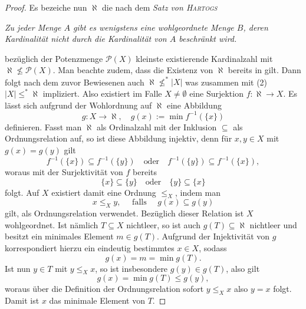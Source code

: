 \begin{proof}
  Es bezeiche nun $\aleph$ die nach dem \textit{Satz von \textsc{Hartogs} }
  \begin{addmargin}[2em]{2em}%
    \textit{Zu jeder Menge $A$ gibt es wenigstens eine wohlgeordnete Menge $B$, deren Kardinalität nicht durch die Kardinalität von $A$ beschränkt wird.} 
  \end{addmargin}
  bezüglich der Potenzmenge $\mathcal{P}(X)$ kleinste existierende Kardinalzahl mit $\aleph \not\leq \mathcal{P}(X)$.
  Man beachte zudem, dass die Existenz von $\aleph$ bereits in \ZF gilt.
  Dann folgt nach dem zuvor Bewiesenen auch $\aleph \not\leq^* |X|$ was zusammen mit (2) $|X|\leq^* \aleph$ impliziert.
  Also existiert im Falle $X \neq \emptyset$ eine Surjektion $f \colon \aleph \to X$.
  Es lässt sich aufgrund der Wohlordnung auf $\aleph$ eine Abbildung
  \begin{displaymath}
    g \colon X \to \aleph, \quad g(x) := \min f^{-1}(\{x\})
  \end{displaymath}
  definieren.
  Fasst man $\aleph$ als Ordinalzahl mit der Inklusion $\subseteq$ als Ordnungsrelation auf, so ist diese Abbildung injektiv, denn für $x,y \in X$ mit $g(x) = g(y)$ gilt
  \begin{displaymath}
    f^{-1}(\{x\}) \subseteq f^{-1}(\{y\}) \quad\text{oder}\quad f^{-1}(\{y\}) \subseteq f^{-1}(\{x\}),
  \end{displaymath}
  woraus mit der Surjektivität von $f$ bereits
  \begin{displaymath}
    \{x\} \subseteq \{y\} \quad\text{oder}\quad \{y\} \subseteq \{x\}
  \end{displaymath}
  folgt.
  Auf $X$ existiert damit eine Ordnung $\leq_X$, indem man 
  \begin{displaymath}
    x \leq_X y, \quad\text{ falls }\quad g(x) \subseteq g(y)
  \end{displaymath}
  gilt, als Ordnungsrelation verwendet. 
  Bezüglich dieser Relation ist $X$ wohlgeordnet.
  Ist nämlich $T \subseteq X$ nichtleer, so ist auch $g(T) \subseteq \aleph$ nichtleer und besitzt ein minimales Element $m \in g(T)$. Aufgrund der Injektivität von $g$ korrespondiert hierzu ein eindeutig bestimmtes $x \in X$, sodass 
  \begin{displaymath}
    g(x) = m = \min g(T).
  \end{displaymath}
  Ist nun $y \in T$ mit $y \leq_X x$, so ist insbesondere $g(y) \in g(T)$, also gilt 
  \begin{displaymath}
    g(x) = \min g(T) \leq g(y),
  \end{displaymath}
  woraus über die Definition der Ordnungsrelation sofort $y \leq_X x$ also $y = x$ folgt.
  Damit ist $x$ das minimale Element von $T$.


\end{proof}
